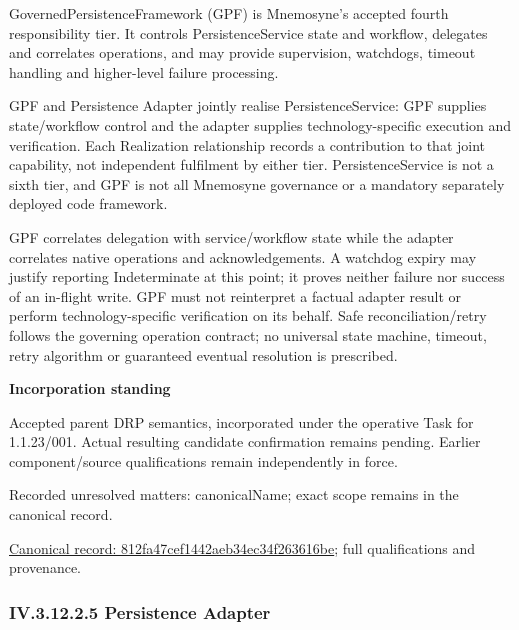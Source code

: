 GovernedPersistenceFramework (GPF) is Mnemosyne's accepted fourth responsibility tier. It controls PersistenceService state and workflow, delegates and correlates operations, and may provide supervision, watchdogs, timeout handling and higher-level failure processing.



GPF and Persistence Adapter jointly realise PersistenceService: GPF supplies state/workflow control and the adapter supplies technology-specific execution and verification. Each Realization relationship records a contribution to that joint capability, not independent fulfilment by either tier. PersistenceService is not a sixth tier, and GPF is not all Mnemosyne governance or a mandatory separately deployed code framework.



GPF correlates delegation with service/workflow state while the adapter correlates native operations and acknowledgements. A watchdog expiry may justify reporting Indeterminate at this point; it proves neither failure nor success of an in-flight write. GPF must not reinterpret a factual adapter result or perform technology-specific verification on its behalf. Safe reconciliation/retry follows the governing operation contract; no universal state machine, timeout, retry algorithm or guaranteed eventual resolution is prescribed.



\par\medskip\textbf{Incorporation standing}\par


Accepted parent DRP semantics, incorporated under the operative Task for 1.1.23/001. Actual resulting candidate confirmation remains pending. Earlier component/source qualifications remain independently in force.


{\small Recorded unresolved matters: canonicalName; exact scope remains in the canonical record.}\par
{\footnotesize \href{../../../../continuum/application/application-function/812fa47cef1442aeb34ec34f263616be.md}{Canonical record: 812fa47cef1442aeb34ec34f263616be}; full qualifications and provenance.}\par
\subsubsection*{IV.3.12.2.5 Persistence Adapter}
\label{navigation:IV.3.12.2.5}

